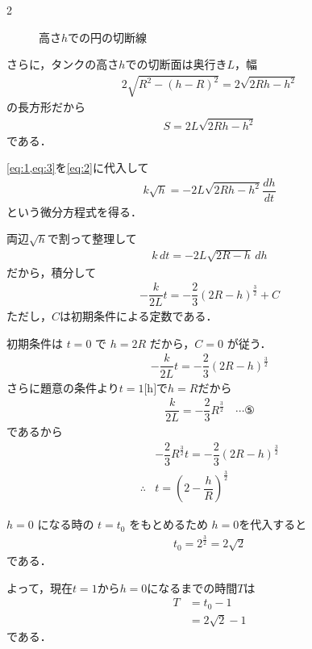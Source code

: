 \documentclass[../../main.tex]{subfiles}
\begin{document}
\begin{multicols}{2}
\begin{figure}[H]
\begin{tikzpicture}[>=stealth]
    \end{tikzpicture}
    \caption{高さ$h$での円の切断線}
    \label{1996-3:fig:2}
  \end{figure}

  さらに，タンクの高さ$h$での切断面は奥行き$L$，幅
  \begin{align}
    2\sqrt{R^2-(h-R)^2} = 2\sqrt{2Rh-h^2}
  \end{align}
  の長方形だから
  \begin{align}
    S = 2L\sqrt{2Rh - h^2} \label{eq:3}
  \end{align}
  である．

  \cref{eq:1,eq:3}を\cref{eq:2}に代入して
  \begin{align}
    k\sqrt{h} = -2L\sqrt{2Rh - h^2} \dfrac{dh}{dt}
  \end{align}
  という微分方程式を得る．

  両辺$\sqrt{h}$で割って整理して
  \begin{align}
    k\,dt = -2L \sqrt{2R-h} \,dh
  \end{align}
  だから，積分して
  \begin{align}
    -\dfrac{k}{2L} t = -\dfrac{2}{3}(2R-h)^{\frac{3}{2}} + C
  \end{align}
  ただし，$C$は初期条件による定数である．

  初期条件は $t=0$ で $h=2R$ だから，$C=0$ が従う．
  \begin{align}
    -\dfrac{k}{2L} t = -\dfrac{2}{3}(2R-h)^{\frac{3}{2}}
  \end{align}
  さらに題意の条件より$t=1\text{[h]}$で$h=R$だから
  \begin{align}
    \dfrac{k}{2L} = -\dfrac{2}{3} R^{\frac{3}{2}} \quad \cdots ⑤
  \end{align}
  であるから
  \begin{align}
    & -\dfrac{2}{3} R^{\frac{3}{2}} t = -\dfrac{2}{3}(2R-h)^{\frac{3}{2}} \\
    \therefore
    & t = \left(2-\dfrac{h}{R}\right)^{\frac{3}{2}}
  \end{align}

  $h=0$ になる時の $t=t_0$ をもとめるため
  $h=0$を代入すると
  \begin{align}
    t_0 = 2^{\frac{3}{2}} = 2\sqrt{2}
  \end{align}
  である．

  よって，現在$t=1$から$h=0$になるまでの時間$T$は
  \begin{align}
    T
    & = t_0 -1                            \\
    & = 2\sqrt{2} -1  \label{eq:4}
  \end{align}
  である．


\end{multicols}
\end{document}
